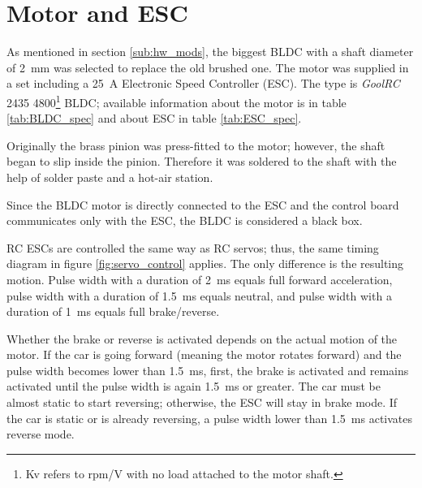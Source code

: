 \section{Motor and ESC}
\label{sec:hw_bldc}
As mentioned in section \ref{sub:hw_mods}, the biggest BLDC with a shaft diameter of \SI{2}{\mm} was selected to replace the old brushed one. The motor was supplied in a set including a \SI{25}{\A} Electronic Speed Controller (ESC). The type is \textit{GoolRC} 2435 \SI{4800}{\Kv}\footnote{\unit{Kv} refers to rpm/V with no load attached to the motor shaft.} BLDC; available information about the motor is in table \ref{tab:BLDC_spec} and about ESC in table \ref{tab:ESC_spec}.

Originally the brass pinion was press-fitted to the motor; however, the shaft began to slip inside the pinion. Therefore it was soldered to the shaft with the help of solder paste and a hot-air station.

Since the BLDC motor is directly connected to the ESC and the control board communicates only with the ESC, the BLDC is considered a black box.

RC ESCs are controlled the same way as RC servos; thus, the same timing diagram in figure \ref{fig:servo_control} applies. The only difference is the resulting motion. Pulse width with a duration of \SI{2}{\ms} equals full forward acceleration, pulse width with a duration of \SI{1.5}{\ms} equals neutral, and pulse width with a duration of \SI{1}{\ms} equals full brake/reverse.

Whether the brake or reverse is activated depends on the actual motion of the motor. If the car is going forward (meaning the motor rotates forward) and the pulse width becomes lower than \SI{1.5}{\ms}, first, the brake is activated and remains activated until the pulse width is again \SI{1.5}{\ms} or greater. The car must be almost static to start reversing; otherwise, the ESC will stay in brake mode. If the car is static or is already reversing, a pulse width lower than \SI{1.5}{\ms} activates reverse mode.

